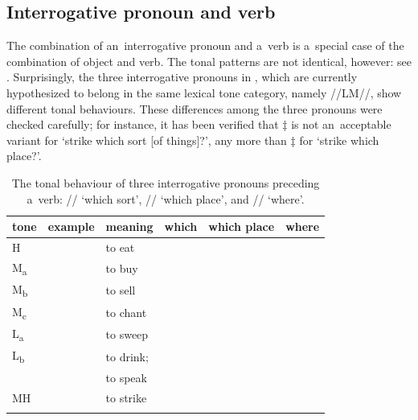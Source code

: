 \subsection{Interrogative pronoun and verb}
\label{sec:interrogativepronounandverb}

The combination of an~interrogative pronoun and a~verb is a~special case of the combination of
object and verb. The tonal patterns are not identical, however: see . Surprisingly, the three interrogative pronouns in , which are currently hypothesized to belong in the
same lexical tone category, namely \mbox{//LM//}, show different tonal behaviours. These differences among the
three pronouns were checked carefully; for instance, it has been verified that $\ddagger${\kern2pt}
is not an~acceptable variant for ‘strike which sort [of things]?’, any more than $\ddagger${\kern2pt} for ‘strike which place?’.

{\setlength\tabcolsep{5.5pt}
\begin{table}%
\caption{\label{tab:whichwhichplacewhere}The tonal behaviour of three interrogative pronouns preceding a~verb: // ‘which sort’, // ‘which place’, and // ‘where’.}
\begin{tabularx}{\textwidth}{ l l l l l Q }
\lsptoprule
	tone & example & meaning & which & which place & where\\ \midrule
	H &  & to eat &  &  & \\
	M\textsubscript{a} &  & to buy &  &  & \\
	M\textsubscript{b} &  & to sell &  &  & \\
	M\textsubscript{c} &  & to chant &  &  & \\
	L\textsubscript{a} &  & to sweep &  &  & \\
	L\textsubscript{b} &  & to drink;  &  &  & \\
	 &  & to speak &  &  & \\
	MH &  & to strike &  &  & \\
\lspbottomrule
\end{tabularx}
\end{table}}

